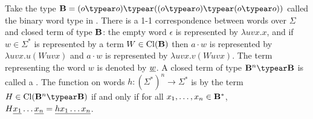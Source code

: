 Take the type $\zaiwordtyp = (o\typear o)\typear ((o\typear o)\typear (o\typear o))$ called the binary word type in \cite{DBLP:journals/tcs/Zaionc87}. There is a 1-1 correspondence between words over $\Sigma$ and closed term of type $\mathbf{B}$: the empty word $\epsilon$ is represented by $\lambda u v x.x$, and if $w\in \Sigma^*$ is represented by a term $W \in {\rm Cl}(\mathbf{B})$ then $a \cdot w$ is represented by $\lambda u v x. u(W uvx)$ and $a \cdot w$ is represented by $\lambda u v x. v(W uvx)$.
The term representing the word $w$ is denoted by $\underline{w}$. A closed term of type $\zaiwordtyp^n \typear \zaiwordtyp$ is called a . The function on words $h:(\Sigma^*)^n \rightarrow \Sigma^*$ is  by the term $H \in \closedof{\zaiwordtyp^n \typear \zaiwordtyp}$ if and only if for all $x_1, \ldots, x_n \in \mathbf{B}^*$, $H \underline{x_1} \ldots \underline{x_n} = \underline{h x_1 \ldots x_n}$.


%

